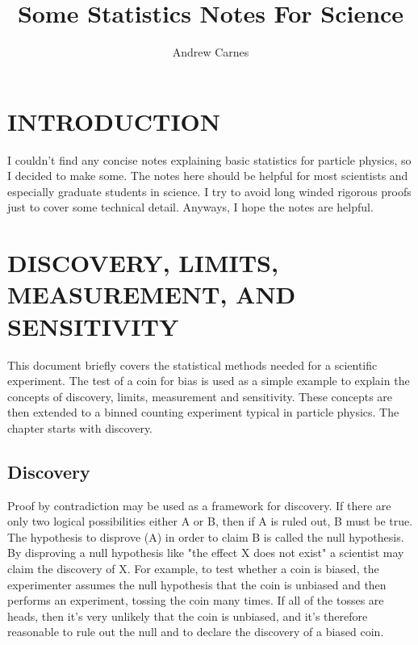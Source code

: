 \documentclass[12pt]{article}
\begin{document}
\title{Some Statistics Notes For Science}
\author{Andrew Carnes}

\maketitle

\newpage
\tableofcontents
\newpage

\section{INTRODUCTION} \label{intro}
I couldn't find any concise notes explaining basic statistics for particle physics, so I decided to make some. The notes here should be helpful for most scientists and especially graduate students in science. I try to avoid long winded rigorous proofs just to cover some technical detail. Anyways, I hope the notes are helpful.  

\section{DISCOVERY, LIMITS, MEASUREMENT, AND SENSITIVITY} \label{stats}

This document briefly covers the statistical methods needed for a scientific experiment. The test of a coin for bias is used as a simple example to explain the concepts of discovery, limits, measurement and sensitivity. These concepts are then extended to a binned counting experiment typical in particle physics. The chapter starts with discovery. 

\subsection{Discovery}
Proof by contradiction may be used as a framework for discovery. If there are only two logical possibilities either A or B, then if A is ruled out, B must be true. The hypothesis to disprove (A) in order to claim B is called the null hypothesis. By disproving a null hypothesis like "the effect X does not exist" a scientist may claim the discovery of X. For example, to test whether a coin is biased, the experimenter assumes the null hypothesis that the coin is unbiased and then performs an experiment, tossing the coin many times. If all of the tosses are heads, then it's very unlikely that the coin is unbiased, and it's therefore reasonable to rule out the null and to declare the discovery of a biased coin. 
\end{document}

